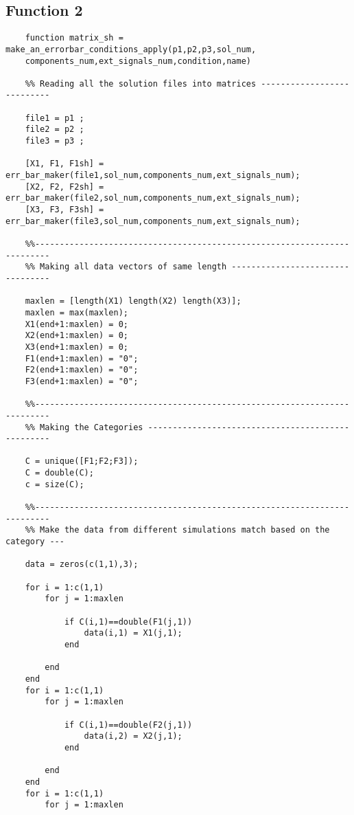 \documentclass{article}
\begin{document}
\subsection*{Function 2}
\begin{verbatim}
    function matrix_sh = make_an_errorbar_conditions_apply(p1,p2,p3,sol_num,
    components_num,ext_signals_num,condition,name)

    %% Reading all the solution files into matrices ---------------------------
    
    file1 = p1 ;
    file2 = p2 ;
    file3 = p3 ;
    
    [X1, F1, F1sh] = err_bar_maker(file1,sol_num,components_num,ext_signals_num);
    [X2, F2, F2sh] = err_bar_maker(file2,sol_num,components_num,ext_signals_num);
    [X3, F3, F3sh] = err_bar_maker(file3,sol_num,components_num,ext_signals_num);
    
    %%-------------------------------------------------------------------------
    %% Making all data vectors of same length ---------------------------------
    
    maxlen = [length(X1) length(X2) length(X3)];
    maxlen = max(maxlen);
    X1(end+1:maxlen) = 0;
    X2(end+1:maxlen) = 0;
    X3(end+1:maxlen) = 0;
    F1(end+1:maxlen) = "0";
    F2(end+1:maxlen) = "0";
    F3(end+1:maxlen) = "0"; 
    
    %%-------------------------------------------------------------------------
    %% Making the Categories --------------------------------------------------
    
    C = unique([F1;F2;F3]);
    C = double(C);
    c = size(C);
    
    %%-------------------------------------------------------------------------
    %% Make the data from different simulations match based on the category ---
    
    data = zeros(c(1,1),3);
    
    for i = 1:c(1,1)
        for j = 1:maxlen
            
            if C(i,1)==double(F1(j,1))
                data(i,1) = X1(j,1);
            end
    
        end
    end
    for i = 1:c(1,1)
        for j = 1:maxlen
            
            if C(i,1)==double(F2(j,1))
                data(i,2) = X2(j,1);
            end
    
        end
    end
    for i = 1:c(1,1)
        for j = 1:maxlen
            

\end{verbatim}
\end{document}
